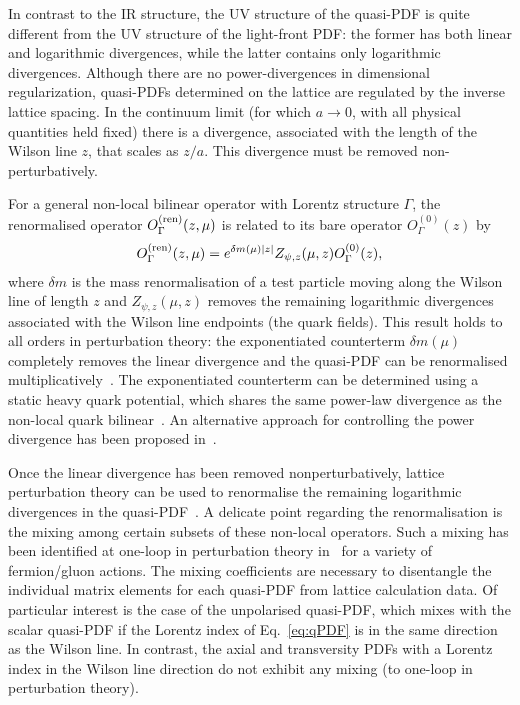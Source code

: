 \begin{itemize}
In contrast to the IR structure, the UV structure of the quasi-PDF is quite 
different from the UV structure of the light-front PDF: the former has both 
linear and logarithmic divergences, while the latter contains only logarithmic 
divergences. 
%
Although there are no power-divergences in dimensional regularization, 
quasi-PDFs determined on the lattice are regulated by the inverse lattice 
spacing. 
%
In the continuum limit (for which $a\to 0$, with all physical quantities 
held fixed) there is a divergence, associated with the length of the Wilson 
line $z$, that scales as $z/a$. This divergence must be removed 
non-perturbatively.

For a general non-local bilinear operator with Lorentz structure $\Gamma$, 
the renormalised operator $O_{\Gamma}^{\rm (ren)}(z,\mu)$ is related to its bare 
operator $O^{(0)}_{\Gamma}(z)$ by~\cite{Dotsenko:1979wb, Arefeva:1980zd, 
Craigie:1980qs,Dorn:1986dt}
\begin{eqnarray}\label{eq:renorm_non-local}
O_{\Gamma}^{\rm (ren)}(z,\mu)=e^{\delta m(\mu)|z|}Z_{\psi, z}(\mu,z)O^{(0)}_{\Gamma}(z),
\end{eqnarray}
where $\delta m$ is the mass renormalisation of a test particle moving along 
the Wilson line of length $z$ and $Z_{\psi, z}(\mu,z)$ removes the remaining 
logarithmic divergences associated with the Wilson line endpoints 
(the quark fields). 
%
This result holds to all orders in perturbation theory: the exponentiated 
counterterm $\delta m(\mu)$ completely removes the linear divergence and the 
quasi-PDF can be renormalised multiplicatively~\cite{Ji:2015jwa,Ji:2017oey}. 
%
The exponentiated counterterm can be determined using a static heavy quark 
potential, which shares the same power-law divergence as the non-local quark 
bilinear~\cite{Musch:2010ka,Ishikawa:2016znu, Chen:2016fxx}. 
%
An alternative approach for controlling the power divergence has been proposed 
in~\cite{Monahan:2016bvm}.

Once the linear divergence has been removed nonperturbatively, lattice 
perturbation theory can be used to renormalise the remaining logarithmic 
divergences in the quasi-PDF~\cite{Ishikawa:2016znu, Carlson:2017gpk}. 
%
A delicate point regarding the renormalisation is the mixing among certain 
subsets of these non-local operators. 
%
Such a mixing has been identified at one-loop in perturbation theory 
in~\cite{Constantiou:2017soon} for a variety of fermion/gluon actions. 
%
The mixing coefficients are necessary to disentangle the individual matrix 
elements for each quasi-PDF from lattice calculation data. 
%
Of particular interest is the case of the unpolarised quasi-PDF, 
which mixes with the scalar quasi-PDF if the Lorentz index of 
Eq.~\eqref{eq:qPDF} is in the same direction as the Wilson line. 
%
In contrast, the axial and transversity PDFs with a Lorentz index in the Wilson 
line direction do not exhibit any mixing (to one-loop in perturbation theory). 


\end{itemize}
